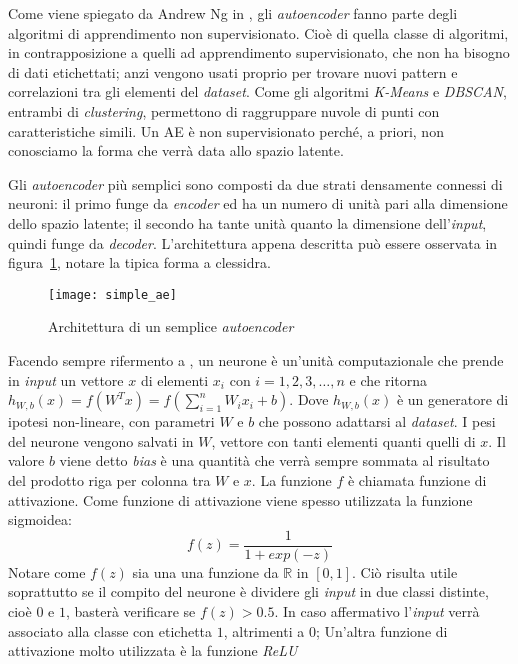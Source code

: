 Come viene spiegato da Andrew Ng in \cite{ng_sparse_ae}, gli \textit{autoencoder} fanno parte degli algoritmi di apprendimento non supervisionato.
Cioè di quella classe di algoritmi, in contrapposizione a quelli ad apprendimento supervisionato, che non ha bisogno di dati etichettati; anzi vengono usati proprio per trovare nuovi pattern e correlazioni tra gli elementi del \textit{dataset}.
Come gli algoritmi \textit{K-Means} e \textit{DBSCAN}, entrambi di \textit{clustering}, permettono di raggruppare nuvole di punti con caratteristiche simili. %
Un AE è non supervisionato perché, a priori, non conosciamo la forma che verrà data allo spazio latente. %

Gli \textit{autoencoder} più semplici sono composti da due strati densamente connessi di neuroni: il primo funge da \textit{encoder} ed ha un numero di unità pari alla dimensione dello spazio latente; il secondo ha tante unità quanto la dimensione dell'\textit{input}, quindi funge da \textit{decoder}.
L'architettura appena descritta può essere osservata in figura~\ref{fig:semplice_ae}, notare la tipica forma a clessidra.

\begin{figure}[ht] %
  \begin{center}
    \centering\texttt{[image: simple\_ae]}
  \end{center}
  \caption{Architettura di un semplice \textit{autoencoder}}
  \label{fig:semplice_ae}
\end{figure}

Facendo sempre rifermento a \cite{ng_sparse_ae}, un neurone è un'unità computazionale che prende in \textit{input} un vettore $x$ di elementi $x_i$ con $i=1,2,3,\dots,n$ e che ritorna $h_{W,b}(x) = f(W^Tx) = f(\sum_{i=1}^{n} W_i x_i + b)$.
Dove $h_{W,b}(x)$ è un generatore di ipotesi non-lineare, con parametri $W$ e $b$ che possono adattarsi al \textit{dataset}.
I pesi del neurone vengono salvati in $W$, vettore con tanti elementi quanti quelli di $x$.
Il valore $b$ viene detto \textit{bias} è una quantità che verrà sempre sommata al risultato del prodotto riga per colonna tra $W$ e $x$.
La funzione $f$ è chiamata funzione di attivazione.
Come funzione di attivazione viene spesso utilizzata la funzione sigmoidea:
\begin{equation*}
  f(z) = \frac{1}{1 + exp(-z)}
\end{equation*} %
Notare come $f(z)$ sia una una funzione da $\mathbb{R}$ in $[0,1]$.
Ciò risulta utile soprattutto se il compito del neurone è dividere gli \textit{input} in due classi distinte, cioè $0$ e $1$, basterà verificare se $f(z)>0.5$.
In caso affermativo l'\textit{input} verrà associato alla classe con etichetta $1$, altrimenti a $0$;
Un'altra funzione di attivazione molto utilizzata è la funzione \textit{ReLU}


